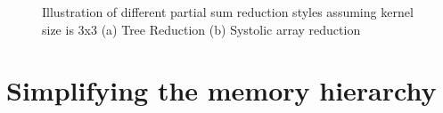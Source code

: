\begin{figure}
    \centering
    \caption{Illustration of different partial sum reduction styles assuming kernel size is 3x3 (a) Tree Reduction (b) Systolic array reduction}
    \label{fig:reduction_styles}
\end{figure}

\section{Simplifying the memory hierarchy}
\label{chap:hw_dse:simplifying_hierarchy}

